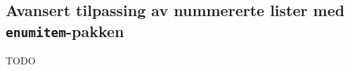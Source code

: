 \subsection{Avansert tilpassing av nummererte lister med \texttt{enumitem}-pakken}
\label{pkg:enumitem}

TODO